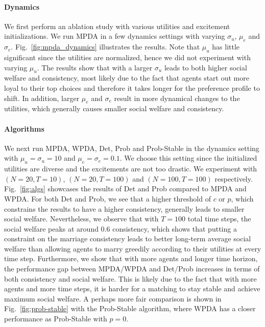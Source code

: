 \paragraph{Dynamics} We first perform an ablation study with various utilities and excitement initializations. We run MPDA in a few dynamics settings with varying $\sigma_u$, $\mu_e$ and $\sigma_e$. Fig.~\ref{fig:mpda_dynamics} illustrates the results. Note that $\mu_u$ has little significant since the utilities are normalized, hence we did not experiment with varying $\mu_u$. The results show that with a larger $\sigma_u$ leads to both higher social welfare and consistency, most likely due to the fact that agents start out more loyal to their top choices and therefore it takes longer for the preference profile to shift. In addition, larger $\mu_e$ and $\sigma_e$ result in more dynamical changes to the utilities, which generally causes smaller social welfare and consistency.



\paragraph{Algorithms} We next run MPDA, WPDA, Det, Prob and Prob-Stable in the dynamics setting with $\mu_u = \sigma_u = 10$ and $\mu_e = \sigma_e = 0.1$. We choose this setting since the initialized utilities are diverse and the excitements are not too drastic. We experiment with $(N=20, T=10)$, $(N=20, T=100)$ and $(N=100, T=100)$ respectively. Fig.~\ref{fig:algs} showcases the results of Det and Prob compared to MPDA and WPDA. For both Det and Prob, we see that a higher threshold of $c$ or $p$, which constrains the results to have a higher consistency, generally leads to smaller social welfare. Nevertheless, we observe that with $T=100$ total time steps, the social welfare peaks at around 0.6 consistency, which shows that putting a constraint on the marriage consistency leads to better long-term average social welfare than allowing agents to marry greedily according to their utilities at every time step. Furthermore, we show that with more agents and longer time horizon, the performance gap between MPDA/WPDA and Det/Prob increases in terms of both consistency and social welfare. This is likely due to the fact that with more agents and more time steps, it is harder for a matching to stay stable and achieve maximum social welfare. A perhaps more fair comparison is shown in Fig.~\ref{fig:prob-stable} with the Prob-Stable algorithm, where WPDA has a closer performance as Prob-Stable with $p=0$.

